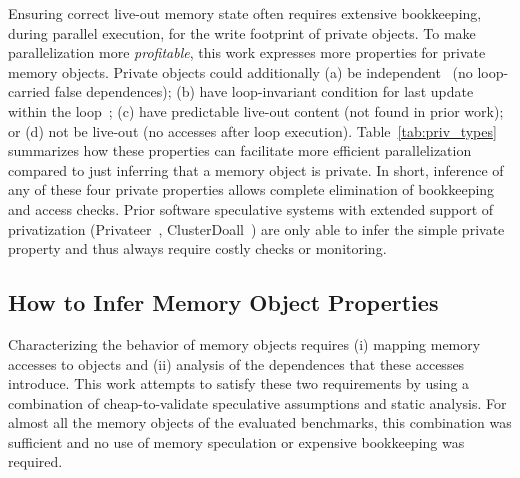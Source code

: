 Ensuring correct live-out memory state often requires extensive bookkeeping,
during parallel execution, for the write footprint of private objects. To make
parallelization more \textit{profitable}, this work expresses more properties
for private memory objects. Private objects could additionally (a) be
independent~\cite{ARRAY_privatization} (no loop-carried false dependences); (b)
have loop-invariant condition for last update within the
loop~\cite{ARRAY_privatization}; (c) have predictable live-out content (not
found in prior work); or (d) not be live-out (no accesses after loop execution).
%
%
Table~\ref{tab:priv_types} summarizes how these properties can facilitate more
efficient parallelization compared to just inferring that a memory object is
private. In short, inference of any of these four private properties allows
complete elimination of bookkeeping and access checks. Prior software
speculative systems with extended support of privatization (Privateer~\cite{},
ClusterDoall~\cite{}) are only able to infer the simple private property and
thus always require costly checks or monitoring.




\subsection{How to Infer Memory Object Properties}

Characterizing the behavior of memory objects requires
(i) mapping memory accesses to objects and (ii) analysis of the dependences that
these accesses introduce.
This work attempts to satisfy these two requirements by using a combination of
cheap-to-validate speculative assumptions and static analysis. For almost all
the memory objects of the evaluated benchmarks, this combination was sufficient
and no use of memory speculation or expensive bookkeeping was required.


